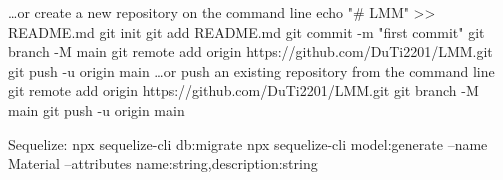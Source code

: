 …or create a new repository on the command line
echo "# LMM" >> README.md
git init
git add README.md
git commit -m "first commit"
git branch -M main
git remote add origin https://github.com/DuTi2201/LMM.git
git push -u origin main
…or push an existing repository from the command line
git remote add origin https://github.com/DuTi2201/LMM.git
git branch -M main
git push -u origin main



Sequelize: npx sequelize-cli db:migrate
npx sequelize-cli model:generate --name Material --attributes name:string,description:string